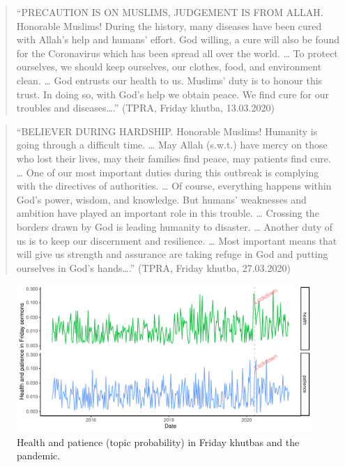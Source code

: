 \documentclass[
  12pt,
]{article}
\begin{document}
\begin{quote}
``PRECAUTION IS ON MUSLIMS, JUDGEMENT IS FROM ALLAH. Honorable Muslims! During the history, many diseases have been cured with Allah's help and humans' effort. God willing, a cure will also be found for the Coronavirus which has been spread all over the world. \ldots{} To protect ourselves, we should keep ourselves, our clothes, food, and environment clean. \ldots{} God entrusts our health to us. Muslims' duty is to honour this trust. In doing so, with God's help we obtain peace. We find cure for our troubles and diseases\ldots.'' (TPRA, Friday khutba, 13.03.2020)
\end{quote}

\begin{quote}
``BELIEVER DURING HARDSHIP. Honorable Muslims! Humanity is going through a difficult time. \ldots{} May Allah (s.w.t.) have mercy on those who lost their lives, may their families find peace, may patients find cure. \ldots{} One of our most important duties during this outbreak is complying with the directives of authorities. \ldots{} Of course, everything happens within God's power, wisdom, and knowledge. But humans' weaknesses and ambition have played an important role in this trouble. \ldots{} Crossing the borders drawn by God is leading humanity to disaster. \ldots{} Another duty of us is to keep our discernment and resilience. \ldots{} Most important means that will give us strength and assurance are taking refuge in God and putting ourselves in God's hands\ldots.'' (TPRA, Friday khutba, 27.03.2020)
\end{quote}

\begin{figure}

{\centering \includegraphics{Khutbas_files/figure-latex/fig-4-1} 

}

\caption{Health and patience (topic probability) in Friday khutbas and the pandemic.}\label{fig:fig-4}
\end{figure}
\end{document}
